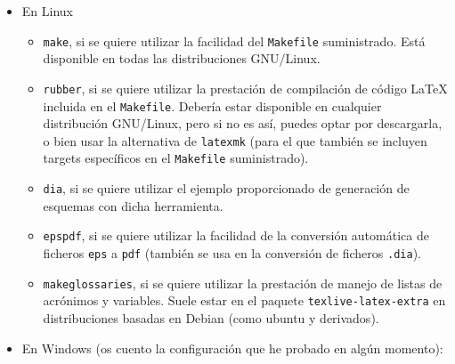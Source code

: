 \begin{itemize}
  \item En Linux

        \begin{itemize}
          \item \texttt{make}, si se quiere utilizar la facilidad del \texttt{Makefile} suministrado. Está disponible en todas las distribuciones GNU/Linux.
          \item \texttt{rubber}, si se quiere utilizar la prestación de compilación de código \LaTeX{} incluida en el \texttt{Makefile}. Debería estar disponible en cualquier distribución GNU/Linux, pero si no es así, puedes optar por descargarla, o bien usar la alternativa de \texttt{latexmk} (para el que también se incluyen targets específicos en el \texttt{Makefile} suministrado).
          \item \texttt{dia}, si se quiere utilizar el ejemplo proporcionado de generación de esquemas con dicha herramienta.
          \item \texttt{epspdf}, si se quiere utilizar la facilidad de la conversión automática de ficheros \texttt{eps} a \texttt{pdf} (también se usa en la conversión de ficheros \texttt{.dia}).
          \item \texttt{makeglossaries}, si se quiere utilizar la prestación de manejo de listas de acrónimos y variables. Suele estar en el paquete \texttt{texlive-latex-extra} en distribuciones basadas en Debian (como ubuntu y derivados).
        \end{itemize}

  \item En Windows (os cuento la configuración que he probado en algún momento):


\end{itemize}
